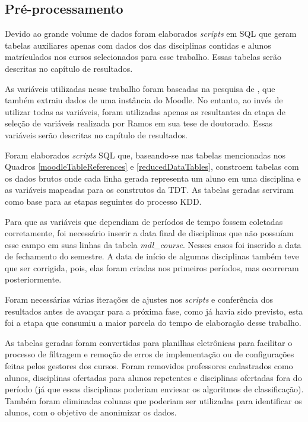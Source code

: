 \subsection{Pré-processamento}

Devido ao grande volume de dados foram elaborados \textit{scripts} em SQL que
geram tabelas auxiliares apenas com dados dos das disciplinas contidas e alunos
matrículados nos cursos selecionados para esse trabalho. Essas tabelas serão
descritas no capítulo de resultados.

As variáveis utilizadas nesse trabalho foram baseadas na pesquisa de
, que também extraiu dados de uma instância do
Moodle. No entanto, ao invés de utilizar todas as variáveis, foram utilizadas
apenas as resultantes da etapa de seleção de variáveis realizada por Ramos em
sua tese de doutorado. Essas variáveis serão descritas no capítulo de
resultados.

Foram elaborados \textit{scripts} SQL que, baseando-se nas tabelas mencionadas
nos Quadros \ref{moodleTableReferences} e \ref{reducedDataTables}, constroem
tabelas com os dados brutos onde cada linha gerada representa um aluno em uma
disciplina e as variáveis mapeadas para os construtos da TDT. As tabelas geradas
serviram como base para as etapas seguintes do processo KDD.

Para que as variáveis que dependiam de períodos de tempo fossem coletadas
corretamente, foi necessário inserir a data final de disciplinas que não
possuíam esse campo em suas linhas da tabela \textit{mdl\_course}. Nesses casos foi
inserido a data de fechamento do semestre. A data de início de algumas
disciplinas também teve que ser corrigida, pois, elas foram criadas nos
primeiros períodos, mas ocorreram posteriormente.

Foram necessárias várias iterações de ajustes nos \textit{scripts} e conferência
dos resultados antes de avançar para a próxima fase, como já havia sido
previsto, esta foi a etapa que consumiu a maior parcela do tempo de elaboração
desse trabalho.

As tabelas geradas foram convertidas para planilhas eletrônicas para facilitar o
processo de filtragem e remoção de erros de implementação ou de configurações
feitas pelos gestores dos cursos. Foram removidos professores cadastrados como
alunos, disciplinas ofertadas para alunos repetentes e disciplinas ofertadas
fora do período (já que essas disciplinas poderiam enviesar os algoritmos de
classificação). Também foram eliminadas colunas que poderiam ser utilizadas para
identificar os alunos, com o objetivo de anonimizar os dados.

